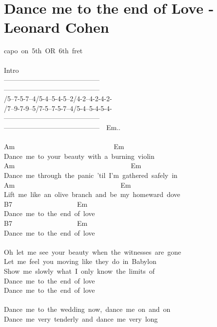 \documentclass[]{book}
\let\stdsection\section
\renewcommand\section{\clearpage\stdsection}
\begin{document}
\hypertarget{dance-me-to-the-end-of-love---leonard-cohen}{%
\section{Dance me to the end of Love - Leonard Cohen}\label{dance-me-to-the-end-of-love---leonard-cohen}}

capo~on~5th~OR~6th~fret\\
~\\
Intro\\
\textbar------------------------------------------\textbar{}\\
\textbar------------------------------------------\textbar{}\\
/5--7-5-7--4/5-4--5-4-5--2/4-2--4-2-4-2-\textbar{}\\
/7--9-7-9--5/7-5--7-5-7--4/5-4--5-4-5-4-\textbar{}\\
\textbar------------------------------------------\textbar{}\\
\textbar------------------------------------------\textbar~~Em..\\
~\\
Am~~~~~~~~~~~~~~~~~~~~~~~~~~~~~Em\\
Dance~me~to~your~beauty~with~a~burning~violin\\
Am~~~~~~~~~~~~~~~~~~~~~~~~~~~~~~~~~~Em\\
Dance~me~through~the~panic~'til~I'm~gathered~safely~in\\
Am~~~~~~~~~~~~~~~~~~~~~~~~~~~~~~~Em\\
Lift~me~like~an~olive~branch~and~be~my~homeward~dove\\
B7~~~~~~~~~~~~~~~~~~~Em\\
Dance~me~to~the~end~of~love\\
B7~~~~~~~~~~~~~~~~~~~Em\\
Dance~me~to~the~end~of~love\\
~\\
Oh~let~me~see~your~beauty~when~the~witnesses~are~gone~\\
Let~me~feel~you~moving~like~they~do~in~Babylon~\\
Show~me~slowly~what~I~only~know~the~limits~of~\\
Dance~me~to~the~end~of~love~\\
Dance~me~to~the~end~of~love~\\
~\\
Dance~me~to~the~wedding~now,~dance~me~on~and~on~\\
Dance~me~very~tenderly~and~dance~me~very~long~\\
\end{document}

